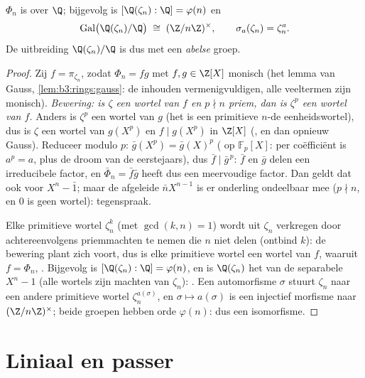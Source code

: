 \begin{theorem}\label{thm:b3:galois:cyclotomicirred}
$\Phi_n$ is  over $\Q$; bijgevolg is $[\Q(\zeta_n) :
\Q] = \varphi(n)$ en
\[
\operatorname{Gal}\bigl(\Q(\zeta_n)/\Q\bigr) \;\cong\;
(\Z/n\Z)^\times,
\qquad \sigma_a(\zeta_n) = \zeta_n^a .
\]
De uitbreiding $\Q(\zeta_n)/\Q$ is dus  met een
\emph{abelse} groep.
\end{theorem}

\begin{proof}
Zij $f = \pi_{\zeta_n}$, zodat $\Phi_n = fg$ met $f, g \in \Z[X]$
monisch (het lemma van Gauss, \cref{lem:b3:rings:gauss}: de
inhouden vermenigvuldigen, alle veeltermen zijn monisch).
\emph{Bewering: is $\zeta$ een wortel van $f$ en $p \nmid n$
priem, dan is $\zeta^p$ een wortel van $f$.} Anders is $\zeta^p$
een wortel van $g$ (het is een primitieve $n$-de eenheidswortel),
dus is $\zeta$ een wortel van $g(X^p)$ en $f \mid g(X^p)$ in
$\Z[X]$ (, en dan opnieuw Gauss). Reduceer modulo
$p$: $\bar g(X^p) = \bar g(X)^p$ ( op $\mathbb F_p[X]$:
per coëfficiënt is $a^p = a$, plus de droom van de eerstejaars),
dus $\bar f \mid \bar g^{\,p}$: $\bar f$ en $\bar g$ delen een
irreducibele factor, en $\bar\Phi_n = \bar f\bar g$ heeft dus een
meervoudige factor. Dan geldt dat ook voor $X^n - \bar 1$; maar de
afgeleide $\bar nX^{n-1}$ is er onderling ondeelbaar mee ($p \nmid
n$, en $0$ is geen wortel): tegenspraak.

Elke primitieve wortel $\zeta_n^k$ (met $\gcd(k, n) = 1$) wordt
uit $\zeta_n$ verkregen door achtereenvolgens priemmachten te
nemen die $n$ niet delen (ontbind $k$): de bewering plant zich
voort, dus is elke primitieve wortel een wortel van $f$, waaruit
$f = \Phi_n$, . Bijgevolg is $[\Q(\zeta_n):\Q] =
\varphi(n)$, en is $\Q(\zeta_n)$ het  van de
separabele $X^n - 1$ (alle wortels zijn machten van $\zeta_n$):
. Een automorfisme $\sigma$ stuurt $\zeta_n$ naar een andere
primitieve wortel $\zeta_n^{a(\sigma)}$, en $\sigma \mapsto
a(\sigma)$ is een injectief morfisme naar $(\Z/n\Z)^\times$; beide
groepen hebben orde $\varphi(n)$: dus een isomorfisme.
\end{proof}

\section{Liniaal en passer}

